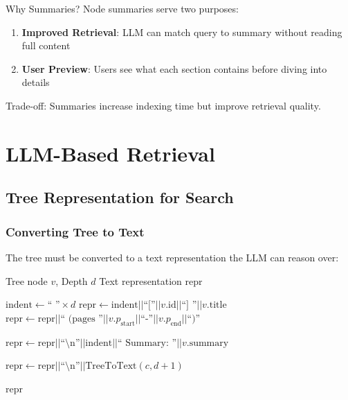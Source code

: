 \begin{conceptbox}{Why Summaries?}
Node summaries serve two purposes:
\begin{enumerate}
    \item \textbf{Improved Retrieval}: LLM can match query to summary without reading full content
    \item \textbf{User Preview}: Users see what each section contains before diving into details
\end{enumerate}

Trade-off: Summaries increase indexing time but improve retrieval quality.
\end{conceptbox}

\section{LLM-Based Retrieval}

\subsection{Tree Representation for Search}

\subsubsection{Converting Tree to Text}

The tree must be converted to a text representation the LLM can reason over:

\begin{algorithm}[H]
\caption{Tree to Search Representation}
\begin{algorithmic}[1]
\Require Tree node $v$, Depth $d$
\Ensure Text representation $\text{repr}$

\State $\text{indent} \gets \text{``  ''} \times d$
\State $\text{repr} \gets \text{indent} || \text{``[''} || v.\text{id} || \text{``] ''} || v.\text{title}$
\State $\text{repr} \gets \text{repr} || \text{`` (pages ''} || v.p_{\text{start}} || \text{``-''} || v.p_{\text{end}} || \text{``)''}$

    \State $\text{repr} \gets \text{repr} || \text{``\textbackslash n''} || \text{indent} || \text{``  Summary: ''} || v.\text{summary}$
\EndIf

    \State $\text{repr} \gets \text{repr} || \text{``\textbackslash n''} || \text{TreeToText}(c, d+1)$
\EndFor

\State \Return $\text{repr}$
\end{algorithmic}
\end{algorithm}

